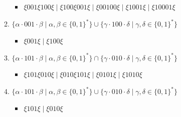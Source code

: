 \documentclass[12pt]{article}
\begin{document}
\begin{enumerate}
\begin{enumerate}[label=\arabic*)]
    \begin{itemize}
      \item $\xi 001 \xi 100 \xi \mid \xi 100 \xi 001 \xi \mid \xi 00100 \xi \mid \xi 1001 \xi \mid \xi 10001\xi  $
    \end{itemize}
    \item $\{ \alpha \cdot 001 \cdot \beta \mid \alpha, \beta \in \{0, 1\}^*\} \cup \{\gamma \cdot 100 \cdot \delta \mid \gamma, \delta \in \{0, 1\}^* \}$
    \begin{itemize}
      \item $\xi 001 \xi \mid \xi 100 \xi $
    \end{itemize}
    \item $\{ \alpha \cdot 101 \cdot \beta \mid \alpha, \beta \in \{0, 1\}^*\} \cap \{\gamma \cdot 010 \cdot \delta \mid \gamma, \delta \in \{0, 1\}^* \}$
    \begin{itemize}
      \item $\xi 101 \xi 010 \xi \mid \xi 010 \xi 101 \xi \mid \xi 0101 \xi \mid \xi 1010 \xi $
    \end{itemize}
    \item $\{ \alpha \cdot 101 \cdot \beta \mid \alpha, \beta \in \{0, 1\}^*\} \cup \{\gamma \cdot 010 \cdot \delta \mid \gamma, \delta \in \{0, 1\}^* \}$
    \begin{itemize}
      \item $\xi 101 \xi \mid \xi 010 \xi $
    \end{itemize}


\end{enumerate}
\end{enumerate}
\end{document}
